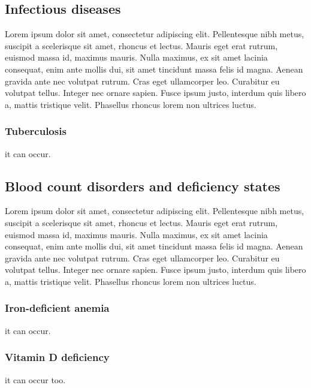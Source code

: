 
\subsection{Infectious diseases}\label{sub:infectiousdiseases}
Lorem ipsum dolor sit amet, consectetur adipiscing elit. Pellentesque nibh metus, suscipit a scelerisque sit amet, rhoncus et lectus. Mauris eget erat rutrum, euismod massa id, maximus mauris. Nulla maximus, ex sit amet lacinia consequat, enim ante mollis dui, sit amet tincidunt massa felis id magna. Aenean gravida ante nec volutpat rutrum. Cras eget ullamcorper leo. Curabitur eu volutpat tellus. Integer nec ornare sapien. Fusce ipsum justo, interdum quis libero a, mattis tristique velit. Phasellus rhoncus lorem non ultrices luctus.

\subsubsection{Tuberculosis}\label{sub:tbc} it can occur.

\subsection{Blood count disorders and deficiency states}\label{sub:bloodcountdisorders}
Lorem ipsum dolor sit amet, consectetur adipiscing elit. Pellentesque nibh metus, suscipit a scelerisque sit amet, rhoncus et lectus. Mauris eget erat rutrum, euismod massa id, maximus mauris. Nulla maximus, ex sit amet lacinia consequat, enim ante mollis dui, sit amet tincidunt massa felis id magna. Aenean gravida ante nec volutpat rutrum. Cras eget ullamcorper leo. Curabitur eu volutpat tellus. Integer nec ornare sapien. Fusce ipsum justo, interdum quis libero a, mattis tristique velit. Phasellus rhoncus lorem non ultrices luctus.


\subsubsection{Iron-deficient anemia}\label{sub:iron-deficiency} it can occur.

\subsubsection{Vitamin D deficiency}\label{sub:vitaminddeficiency} it can occur too.

